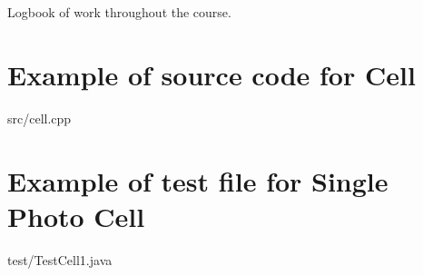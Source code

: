 \begin{appendices}
\begin{table}[H]
    
    \caption{Logbook of work throughout the course.}
    \label{tab:logbook}
    
\end{table}






\newpage
\section{Example of source code for Cell}

{src/cell.cpp}


\section{Example of test file for Single Photo Cell}
\label{sec:test_example}


{test/TestCell1.java}



\end{appendices}
